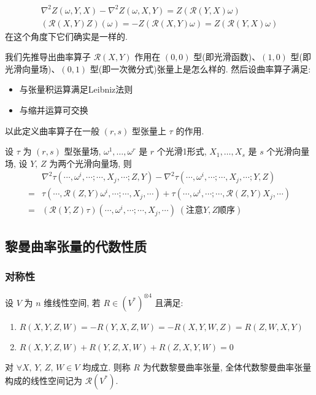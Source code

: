 \begin{gather*}
    \nabla^2Z(\omega,Y,X) - \nabla^2Z(\omega,X,Y) = Z(\mathcal{R}(Y,X)\omega) \\
    (\mathcal{R}(X,Y)Z)(\omega) = -Z(\mathcal{R}(X,Y)\omega) = Z(\mathcal{R}(Y,X)\omega)
\end{gather*}
在这个角度下它们确实是一样的.
\begin{definition}[曲率算子作用在张量场]
    我们先推导出曲率算子 $\mathcal{R}(X,Y)$ 作用在 $(0,0)$ 型(即光滑函数)、$(1,0)$ 型(即光滑向量场)、$(0,1)$ 型(即一次微分式)张量上是怎么样的. 然后设曲率算子满足:
    \begin{itemize}
        \item 与张量积运算满足Leibniz法则
        \item 与缩并运算可交换
    \end{itemize}
    以此定义曲率算子在一般 $(r,s)$ 型张量上 $\tau$ 的作用.
\end{definition}
\begin{proposition}[Ricci恒等式]
    设 $\tau$ 为 $(r,s)$ 型张量场, $\omega^1,\dots,\omega^r$ 是 $r$ 个光滑1形式, $X_1,\dots,X_s$ 是 $s$ 个光滑向量场, 设 $Y,\,Z$ 为两个光滑向量场, 则
    \begin{align*}
        & \nabla^2\tau(\cdots,\omega^i,\cdots;\cdots,X_j,\cdots;Z,Y) - \nabla^2\tau(\cdots,\omega^i,\cdots;\cdots,X_j,\cdots;Y,Z) \\
        =& \tau(\cdots,\mathcal{R}(Z,Y)\omega^i,\cdots;\cdots,X_j,\cdots) + \tau(\cdots,\omega^i,\cdots;\cdots,\mathcal{R}(Z,Y)X_j,\cdots) \\
        =&(\mathcal{R}(Y,Z)\tau)(\cdots,\omega^i,\cdots;\cdots,X_j,\cdots) \;(\text{注意}Y,Z\text{顺序})
    \end{align*}
\end{proposition}

\subsection{黎曼曲率张量的代数性质}
\subsubsection{对称性}
    设 $V$ 为 $n$ 维线性空间, 若 $R\in(V^*)^{\otimes4}$ 且满足:
    \begin{enumerate}
        \item $R(X,Y,Z,W) = -R(Y,X,Z,W) = -R(X,Y,W,Z) = R(Z,W,X,Y)$
        \item $R(X,Y,Z,W) + R(Y,Z,X,W) + R(Z,X,Y,W) = 0$
    \end{enumerate} 对 $\forall X,\,Y,\,Z,\,W\in V$ 均成立.
    则称 $R$ 为代数黎曼曲率张量, 全体代数黎曼曲率张量构成的线性空间记为 $\mathcal{R}(V^*)$.

